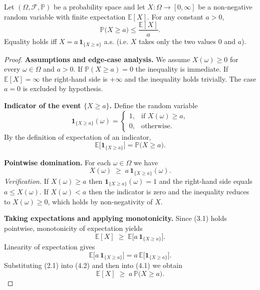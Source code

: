 \begin{theorem}
Let \((\Omega,\mathcal F,\mathbb P)\) be a probability space and let
\(X:\Omega\to[0,\infty]\) be a non‑negative random variable with finite
expectation \(\mathbb E[X]\). For any constant \(a>0\),
\[
\mathbb P\!\bigl(X\ge a\bigr)\le\frac{\mathbb E[X]}{a}.
\]
Equality holds iff \(X=a\,\mathbf 1_{\{X\ge a\}}\) a.s. (i.e. \(X\) takes only
the two values \(0\) and \(a\)).
\end{theorem}

\begin{proof}
\textbf{Assumptions and edge‑case analysis.}  We assume \(X(\omega)\ge0\) for
every \(\omega\in\Omega\) and \(a>0\).  If \(\mathbb P(X\ge a)=0\) the
inequality is immediate.  If \(\mathbb E[X]=\infty\) the right‑hand side is
\(+\infty\) and the inequality holds trivially.  The case \(a=0\) is
excluded by hypothesis.

\medskip
\textbf{Indicator of the event \(\{X\ge a\}\).}  Define the random variable
\[
\mathbf 1_{\{X\ge a\}}(\omega)=
\begin{cases}
1, & \text{if }X(\omega)\ge a,\\[2mm]
0, & \text{otherwise}.
\end{cases}
\]
By the definition of expectation of an indicator,
\begin{equation*}
\mathbb E\!\bigl[\mathbf 1_{\{X\ge a\}}\bigr]=\mathbb P\!\bigl(X\ge a\bigr).
\tag{2.1}
\end{equation*}

\medskip
\textbf{Pointwise domination.}  For each \(\omega\in\Omega\) we have
\begin{equation*}
X(\omega)\;\ge\;a\,\mathbf 1_{\{X\ge a\}}(\omega). \tag{3.1}
\end{equation*}
\emph{Verification.}  If \(X(\omega)\ge a\) then
\(\mathbf 1_{\{X\ge a\}}(\omega)=1\) and the right‑hand side equals \(a\le
X(\omega)\).  If \(X(\omega)<a\) then the indicator is zero and the
inequality reduces to \(X(\omega)\ge0\), which holds by non‑negativity of
\(X\).

\medskip
\textbf{Taking expectations and applying monotonicity.}  Since (3.1) holds
pointwise, monotonicity of expectation yields
\begin{equation*}
\mathbb E[X]\;\ge\;\mathbb E\!\bigl[a\,\mathbf 1_{\{X\ge a\}}\bigr].
\tag{4.1}
\end{equation*}
Linearity of expectation gives
\begin{equation*}
\mathbb E\!\bigl[a\,\mathbf 1_{\{X\ge a\}}\bigr]
   =a\,\mathbb E\!\bigl[\mathbf 1_{\{X\ge a\}}\bigr].
\tag{4.2}
\end{equation*}
Substituting (2.1) into (4.2) and then into (4.1) we obtain
\begin{equation*}
\mathbb E[X]\;\ge\;a\,\mathbb P\!\bigl(X\ge a\bigr).
\tag{4.3}
\end{equation*}


\end{proof}

